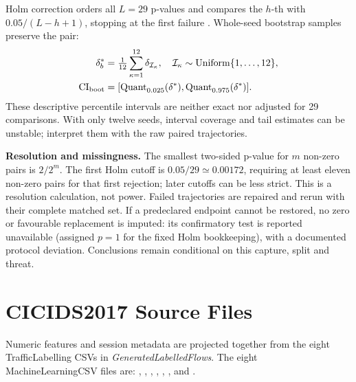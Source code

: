 \documentclass[10pt,a4paper]{article}
\begin{document}
Holm correction orders all $L=29$ p-values and compares the $h$-th with $0.05/(L-h+1)$, stopping at the first failure \cite{holm}. Whole-seed bootstrap samples preserve the pair:
\begin{equation}
\begin{aligned}
\delta_b^*&=\tfrac1{12}\sum_{\kappa=1}^{12}\delta_{\mathcal I_\kappa},\quad
\mathcal I_\kappa\sim\operatorname{Uniform}\{1,\ldots,12\},\\
\mathrm{CI}_{\rm boot}&=[\operatorname{Quant}_{0.025}(\delta^*),\operatorname{Quant}_{0.975}(\delta^*)].
\end{aligned}
\label{eq:bootstrap}
\end{equation}
These descriptive percentile intervals are neither exact nor adjusted for 29 comparisons. With only twelve seeds, interval coverage and tail estimates can be unstable; interpret them with the raw paired trajectories.

\textbf{Resolution and missingness.} The smallest two-sided p-value for $m$ non-zero pairs is $2/2^m$. The first Holm cutoff is $0.05/29\simeq0.00172$, requiring at least eleven non-zero pairs for that first rejection; later cutoffs can be less strict. This is a resolution calculation, not power. Failed trajectories are repaired and rerun with their complete matched set. If a predeclared endpoint cannot be restored, no zero or favourable replacement is imputed: its confirmatory test is reported unavailable (assigned $p=1$ for the fixed Holm bookkeeping), with a documented protocol deviation. Conclusions remain conditional on this capture, split and threat.

\section{CICIDS2017 Source Files}
\label{app:files}
Numeric features and session metadata are projected together from the eight TrafficLabelling CSVs in \emph{GeneratedLabelledFlows}. The eight MachineLearningCSV files are: , , , , , ,  and .
\end{document}
